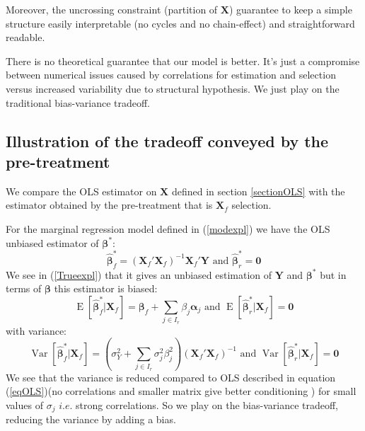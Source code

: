 \documentclass[11pt,a4paper]{article}
\begin{document}
Moreover, the uncrossing constraint (partition of $\boldsymbol{X}$) guarantee to keep a simple structure easily interpretable (no cycles and no chain-effect) and straightforward readable.

	
			There is no theoretical guarantee that our model is better. It's just a compromise between numerical issues caused by correlations for estimation and selection versus increased variability due to structural hypothesis. We just play on the traditional bias-variance tradeoff.
			 
	\subsection{Illustration of the tradeoff conveyed by the pre-treatment}	
	We compare the OLS estimator on $\boldsymbol{X}$ defined in section \ref{sectionOLS} with the estimator obtained by the pre-treatment that is $\boldsymbol{X}_f$ selection.
  
For the marginal regression model defined in (\ref{modexpl})
we have the \textsc{OLS} unbiased estimator of $\boldsymbol{\beta}^*$: 
		\begin{equation}
			\hat{\boldsymbol{\beta}}_f^* = (\boldsymbol{X}_f'\boldsymbol{X}_f)^{-1}\boldsymbol{X}_f'\boldsymbol{Y}  \textrm{ and }\boldsymbol{\hat\beta}_r^* = \boldsymbol{0}
		\end{equation}
		We see in (\ref{Trueexpl}) that it gives an unbiased estimation of $\boldsymbol{Y}$ and $\boldsymbol{\beta^*}$
		but in terms of $\boldsymbol{\beta}$ this estimator is biased:
		\begin{equation}
			\operatorname{E}[\hat{\boldsymbol{\beta}}_f^*|\boldsymbol{X}_f]=\boldsymbol{\beta}_f+\sum_{j \in I_r}\beta_{j}\boldsymbol{\alpha}_j \textrm{ and }\operatorname{E}[\hat{\boldsymbol{\beta}}_r^*|\boldsymbol{X}_f]=\boldsymbol{0}
		\end{equation}
		with variance:
		\begin{equation}
			\operatorname{Var}[\hat{\boldsymbol{\beta}}_f^*|\boldsymbol{X}_f]= (\sigma^2_Y+\sum_{j \in I_r}\sigma^2_{j}\beta_{j}^2 )(\boldsymbol{X}_f' \boldsymbol{X}_f)^{-1}  \textrm{ and }\operatorname{Var}[\hat{\boldsymbol{\beta}}_r^*|\boldsymbol{X}_f]= \boldsymbol{0} 
		\end{equation}
		We see that the variance is reduced compared to OLS described in equation (\ref{eqOLS})(no correlations and smaller matrix give better conditioning ) for small values of $\sigma_j$ $i.e.$ strong correlations. So we play on the bias-variance tradeoff, reducing the variance by adding a bias. 				  
		  
\end{document}
